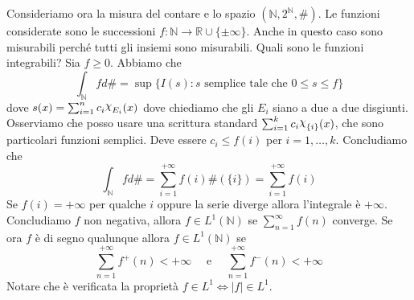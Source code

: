 \begin{example}
    Consideriamo ora la misura del contare e lo spazio \((\mathbb{N},
    2^{\mathbb{N}}, \#)\). Le funzioni considerate sono le successioni
    \(f : \mathbb{N} \to \mathbb{R} \cup \{\pm \infty\} \). Anche in questo caso sono
    misurabili perché tutti gli insiemi sono misurabili. Quali sono le funzioni
    integrabili? Sia \(f \ge 0\).
    Abbiamo che
    \[
        \int_{\mathbb{N}} f d\# = \sup \{ I(s) : s \text{ semplice tale che } 0
        \le s \le f\}
    \]
    dove \(s(x) = \sum_{i=1}^{n} c_{i} \rchi_{E_{i}}(x) \) dove chiediamo che gli
    \(E_{i}\) siano a due a due disgiunti. Osserviamo che posso usare una scrittura standard \(\sum_{i=1}^{k} c_{i}
    \rchi_{\{i\} } (x) \), che sono particolari funzioni semplici. Deve essere
    \(c_{i} \le f(i)\) per \(i = 1, \dots, k\).
    Concludiamo che
    \[
        \int_{\mathbb{N}} f d\# = \sum_{i=1}^{+\infty} f(i) \#(\{i\} ) =
        \sum_{i=1}^{+\infty} f(i)
    \]
    Se \(f(i) = +\infty\) per qualche \(i\) oppure la serie diverge allora
    l'integrale è \(+\infty\).
    Concludiamo \(f\) non negativa, allora \(f \in L^{1}(\mathbb{N})\) se
    \(\sum_{n=1}^{\infty} f(n) \) converge. Se ora \(f\) è di segno qualunque
    allora \(f \in  L^{1}(\mathbb{N})\) se 
    \[
        \sum_{n=1}^{+\infty} f^{+}(n) < +\infty \quad \text{ e } \quad
        \sum_{n=1}^{+\infty} f^{-}(n) < +\infty
    \]
    Notare che è verificata la proprietà \(f \in L^{1} \iff |f| \in L^{1}\).
\end{example}

